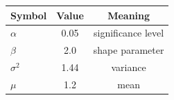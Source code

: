 \begin{table}[htbp]
\centering
\begin{tabular}{lcc}
\toprule
Symbol & Value & Meaning \\
\midrule
$\alpha$ & 0.05 & significance level \\
$\beta$ & 2.0 & shape parameter \\
$\sigma^{2}$ & 1.44 & variance \\
$\mu$ & 1.2 & mean \\
\bottomrule
\end{tabular}
\end{table}
